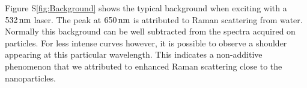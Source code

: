 Figure S\ref{fig:Background} shows the typical background when exciting with a
$532\,\textrm{nm}$ laser. The peak at $650\,\textrm{nm}$ is attributed to Raman scattering from
water. Normally this background can be well subtracted from the spectra acquired
on particles. For less intense curves however, it is possible to observe a
shoulder appearing at this particular wavelength. This indicates a non-additive
phenomenon that we attributed to enhanced Raman scattering close to the
nanoparticles.